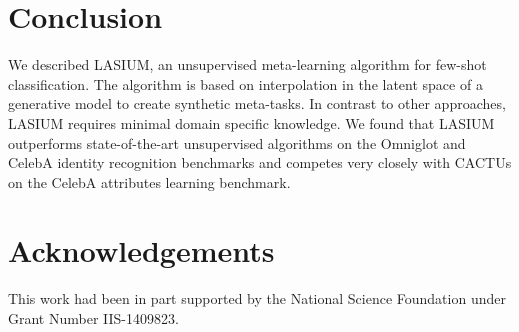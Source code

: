 \documentclass{article}
\begin{document}
    































 \vspace{-2mm}
\section{Conclusion}
\vspace{-2mm}
We described LASIUM, an unsupervised meta-learning algorithm for few-shot classification. The algorithm is based on interpolation in the latent space of a generative model to create synthetic meta-tasks. In contrast to other approaches, LASIUM requires minimal domain specific knowledge. We found that LASIUM outperforms state-of-the-art unsupervised algorithms on the Omniglot and CelebA identity recognition benchmarks and competes very closely with CACTUs on the CelebA attributes learning benchmark. 







 \section{Acknowledgements}
\label{Acknowledgements}

This work had been in part supported by the National Science
Foundation under Grant Number IIS-1409823. 








\end{document}

